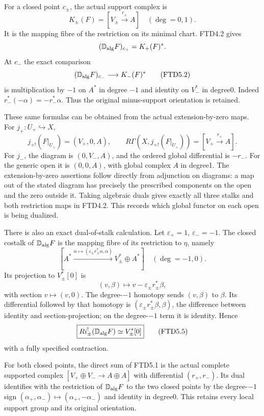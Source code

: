 For a closed point \(c_\pm\), the actual support complex is \[
K_\pm(F)=[V_\pm\xrightarrow{r_\pm}A]\quad(\deg=0,1).
\tag{FTD5.1}
\] It is the mapping fibre of the restriction on its minimal chart.
FTD4.2 gives \[
(\mathbb D_{\rm alg}F)_{c_+}=K_+(F)^*.
\] At \(c_-\) the exact comparison \[
(\mathbb D_{\rm alg}F)_{c_-}\longrightarrow K_-(F)^*
\tag{FTD5.2}
\] is multiplication by \(-1\) on \(A^*\) in degree \(-1\) and identity
on \(V_-^*\) in degree0. Indeed \(r_-^*(-\alpha)=-r_-^*\alpha\). Thus
the original minus-support orientation is retained.

These same formulas can be obtained from the actual extension-by-zero
maps. For \(j_+:U_+\hookrightarrow X\), \[
j_{+!}(F|_{U_+})=(V_+,0,A),\qquad
R\Gamma(X,j_{+!}(F|_{U_+}))=[V_+\xrightarrow{r_+}A].
\] For \(j_-\), the diagram is \((0,V_-,A)\), and the ordered global
differential is \(-r_-\). For the generic open it is \((0,0,A)\), with
global complex \(A\) in degree1. The extension-by-zero assertions follow
directly from adjunction on diagrams: a map out of the stated diagram
has precisely the prescribed components on the open and the zero outside
it. Taking algebraic duals gives exactly all three stalks and both
restriction maps in FTD4.2. This records which global functor on each
open is being dualized.

There is also an exact dual-of-stalk calculation. Let
\(\varepsilon_+=1\), \(\varepsilon_-=-1\). The closed costalk of
\(\mathbb D_{\rm alg}F\) is the mapping fibre of its restriction to
\(\eta\), namely \[
[A^*\xrightarrow{\alpha\mapsto
(\varepsilon_\pm r_\pm^*\alpha,\alpha)}
V_\pm^*\oplus A^*]
\quad(\deg=-1,0).
\tag{FTD5.3}
\] Its projection to \(V_\pm^*[0]\) is \[
(v,\beta)\longmapsto v-\varepsilon_\pm r_\pm^*\beta,
\tag{FTD5.4}
\] with section \(v\mapsto(v,0)\). The degree-\(-1\) homotopy sends
\((v,\beta)\) to \(\beta\). Its differential followed by that homotopy
is \((\varepsilon_\pm r_\pm^*\beta,\beta)\), the difference between
identity and section-projection; on the degree-\(-1\) term it is
identity. Hence \[
\boxed{R i_\pm^!(\mathbb D_{\rm alg}F)\simeq V_\pm^*[0]}
\tag{FTD5.5}
\] with a fully specified contraction.

For both closed points, the direct sum of FTD5.1 is the actual complete
supported complex \([V_+\oplus V_-\to A\oplus A]\) with differential
\((r_+,r_-)\). Its dual identifies with the restriction of
\(\mathbb D_{\rm alg}F\) to the two closed points by the degree-\(-1\)
sign \((\alpha_+,\alpha_-)\mapsto(\alpha_+,-\alpha_-)\) and identity in
degree0. This retains every local support group and its original
orientation.

